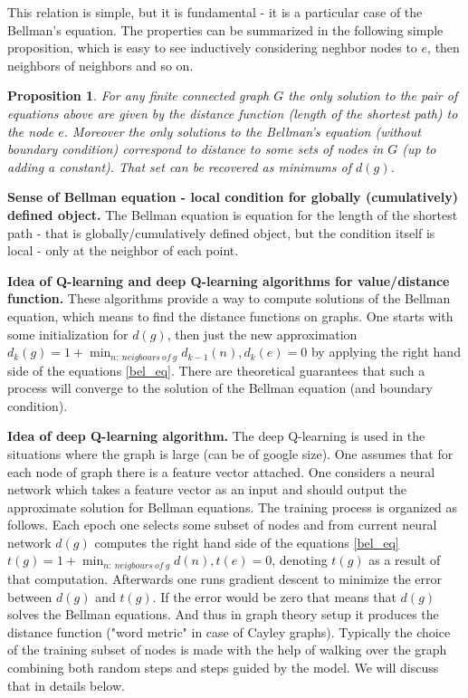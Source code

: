\documentclass[atmp]{ipart_v1}
\numberwithin{equation}{section}
\theoremstyle{plain}%
\newtheorem{proposition}[theorem]{Proposition}
\begin{document}
This relation is simple, but it is fundamental - it is a particular case of the Bellman's equation. The properties can be summarized in the following simple proposition, which is easy to see inductively considering neghbor nodes to $e$, then neighbors of neighbors and so on.

\begin{proposition}
    For any finite connected graph $G$ the only solution to the pair of equations above are given by the  distance function (length of the shortest path) to the node $e$. Moreover the only solutions to the Bellman's equation (without boundary condition) correspond to distance to some sets of nodes in $G$ (up to adding a constant). That set can be recovered as minimums of $d(g)$. 
\end{proposition}

{\bf Sense of Bellman equation - local condition for globally (cumulatively) defined object.}
The Bellman equation is equation for the length of the shortest path - that is globally/cumulatively defined object, but the condition itself is local - only at the neighbor of each point.  

{\bf Idea of Q-learning and deep Q-learning algorithms for value/distance function.}
These algorithms provide a way to compute solutions of the Bellman equation, which means to find the distance functions on graphs.  One starts with some  initialization for $d(g)$, then just  the new approximation $d_k(g) = 1+\min_{n:~neigbours~of~g} d_{k-1}(n), d_{k}(e) =0$ by applying the right hand side of the equations \ref{bel_eq}. There are theoretical guarantees that such a process will converge to the solution of the Bellman equation (and boundary condition). 

{\bf Idea of deep Q-learning algorithm.}
The deep Q-learning is used in the situations where the graph is large (can be of google size). 
One assumes that for each node of graph there is a feature vector attached. 
One considers a neural network which takes a feature vector as an input and should output the approximate solution for Bellman equations.
The training process is organized as follows.
Each epoch one selects some subset of nodes and from current neural network $d(g)$  computes the right hand side of the equations \ref{bel_eq}
$t(g) = 1+\min_{n:~neigbours~of~g} d(n), t(e) =0$, denoting $t(g)$ as a result of that computation. 
Afterwards one runs gradient descent to minimize the error between $d(g)$ and $t(g)$. If the error would be zero that means that $d(g)$ solves the Bellman equations. And thus in graph theory setup it produces the distance function ("word metric" in case of Cayley graphs).
Typically the choice of the training subset of nodes  is made with the help of walking over the graph combining both random steps and steps guided by the model. We will discuss that in details below.
\end{document}
